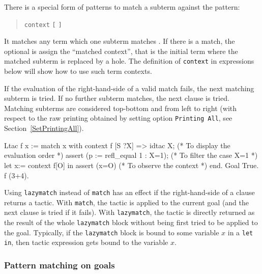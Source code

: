 \begin{Variants}
\item {}
There is a special form of patterns to match a subterm against the
pattern:
\begin{quote}
{\tt context} {\ident} {\tt [} {\cpattern} {\tt ]}
\end{quote}
It matches any term which one subterm matches {\cpattern}. If there is
a match, the optional {\ident} is assign the ``matched context'', that
is the initial term where the matched subterm is replaced by a
hole. The definition of {\tt context} in expressions below will show
how to use such term contexts.

If the evaluation of the right-hand-side of a valid match fails, the
next matching subterm is tried. If no further subterm matches, the
next clause is tried. Matching subterms are considered top-bottom and
from left to right (with respect to the raw printing obtained by
setting option {\tt Printing All}, see Section~\ref{SetPrintingAll}).

\begin{coq_example}
Ltac f x :=
  match x with
    context f [S ?X] => 
    idtac X;                    (* To display the evaluation order *)
    assert (p := refl_equal 1 : X=1);    (* To filter the case X=1 *)
    let x:= context f[O] in assert (x=O) (* To observe the context *)
  end.
Goal True.
f (3+4).
\end{coq_example}

\item {}
Using {\tt lazymatch} instead of {\tt match} has an effect if the
right-hand-side of a clause returns a tactic. With {\tt match}, the
tactic is applied to the current goal (and the next clause is tried if
it fails). With {\tt lazymatch}, the tactic is directly returned as
the result of the whole {\tt lazymatch} block without being first
tried to be applied to the goal. Typically, if the {\tt lazymatch}
block is bound to some variable $x$ in a {\tt let in}, then tactic
expression gets bound to the variable $x$.

\end{Variants}

\subsubsection[Pattern matching on goals]{Pattern matching on goals
}

